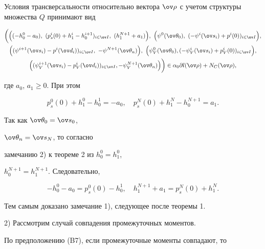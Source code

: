Условия трансверсальности относительно вектора $\ov


\rho$ с учетом структуры множества $Q$ принимают вид


\begin{multline*}


\bigg(\Big((-h_0^0-a_0),\ 


(p_s^i(0)+h_1^i-h_0^{i+1})_{i\in \ov I}, \ (h_1^{N+1}+a_1) \Big),\


\Big( \psi^0(\ov\theta_0), \ (-\psi^i(\ov s_i)+ p^i(0))_{i\in


\ov I} \Big), \\


%


\Big((\psi^{i+1}(\ov s_i)- p^i(\ov


d_i))_{i\in \ov I},\ -\psi^{N+1}(\ov \theta_n) \Big), \ \Big(


\psi_V^0(\ov\theta_0), (-\psi_V^i(\ov s_i)+ p_V^i(0))_{i\in \ov I}


\Big), \\


%


\Big( (\psi_V^{i+1}(\ov s_i)- p_V^i(\ov


d_i))_{i\in \ov I}, -\psi_V^{N+1}(\ov \theta_n) \Big) \bigg) \in


\alpha_0\partial l(\ov \rho)+N_C(\ov \rho),


\end{multline*}


где $a_0$, $a_1\geq 0$. При этом


$$


p_s^0(0)+h_1^0-h_0^1=-a_0, \quad p_s^N(0)+h_1^{N}-h_0^{N+1}=a_1.


$$


Так как $\ov\theta_0=\ov s_0$,


$\ov\theta_n=\ov s_N$, то согласно


замечанию 2) к теореме 2 из \cite{DS99} $h_0^0=h_1^0$,


$h_0^{N+1}=h_1^{N+1}.$ Следовательно,


$$


-h_0^0-a_0=p_s^0(0)-h_0^1,\quad h_1^{N+1}+a_1=p_s^N(0)+h_1^N.


$$


Тем самым доказано замечание 1), следующее после теоремы 1.





2) Рассмотрим случай совпадения промежуточных моментов.


По предположению (B7), если промежуточные моменты совпадают, то



